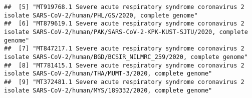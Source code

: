 \documentclass[
]{article}
\begin{document}
\begin{verbatim}
##  [5] "MT919768.1 Severe acute respiratory syndrome coronavirus 2 isolate SARS-CoV-2/human/PHL/GS/2020, complete genome"                                                                                                                                                                                                                                                                                                                                                                                                                 
##  [6] "MT879619.1 Severe acute respiratory syndrome coronavirus 2 isolate SARS-CoV-2/human/PAK/SARS-CoV-2-KPK-KUST-SJTU/2020, complete genome"                                                                                                                                                                                                                                                                                                                                                                                           
##  [7] "MT847217.1 Severe acute respiratory syndrome coronavirus 2 isolate SARS-CoV-2/human/BGD/BCSIR_NILMRC_259/2020, complete genome"                                                                                                                                                                                                                                                                                                                                                                                                   
##  [8] "MT781415.1 Severe acute respiratory syndrome coronavirus 2 isolate SARS-CoV-2/human/THA/MUMT-3/2020, complete genome"                                                                                                                                                                                                                                                                                                                                                                                                             
##  [9] "MT372481.1 Severe acute respiratory syndrome coronavirus 2 isolate SARS-CoV-2/human/MYS/189332/2020, complete genome"                                                                                                                                                                                                                                                                                                                                                                                                             

\end{verbatim}
\end{document}
